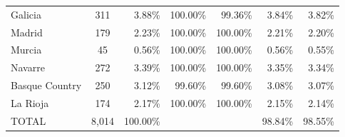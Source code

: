 \documentclass[a4paper,11pt,oneside]{article}
\begin{document}
{\begin{table}
\begin{tabular}{lcrrrrr}
Galicia                & 311                        & 3.88\%      & 100.00\%       & 99.36\%       & 3.84\%                 & 3.82\%                 \\
Madrid    & 179                        & 2.23\%      & 100.00\%       & 100.00\%      & 2.21\%                 & 2.20\%                 \\
Murcia       & 45                         & 0.56\%      & 100.00\%       & 100.00\%      & 0.56\%                 & 0.55\%                 \\
Navarre                & 272                        & 3.39\%      & 100.00\%       & 100.00\%      & 3.35\%                 & 3.34\%                 \\
Basque Country             & 250                        & 3.12\%      & 99.60\%        & 99.60\%       & 3.08\%                 & 3.07\%                 \\
La Rioja               & 174                        & 2.17\%      & 100.00\%       & 100.00\%      & 2.15\%                 & 2.14\%                 \\
\midrule
TOTAL                  & 8,014                       & 100.00\%    &                &               & 98.84\%                & 98.55\%               \\
\bottomrule
\end{tabular}%
\end{table}



\pagebreak
\clearpage



}
\end{document}
